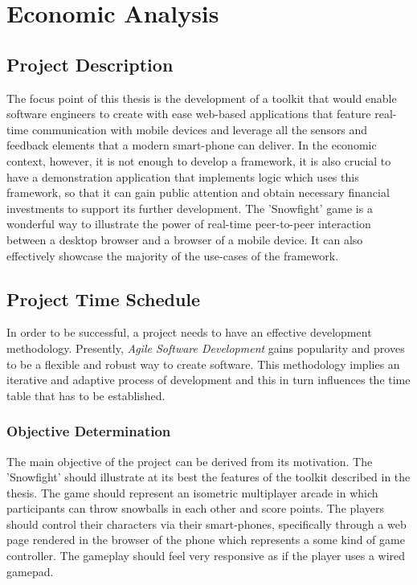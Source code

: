 \section{Economic Analysis}

\subsection{Project Description}

The focus point of this thesis is the development of a toolkit that would
enable software engineers to create with ease web-based applications that
feature real-time communication with mobile devices and leverage all the
sensors and feedback elements that a modern smart-phone can deliver. In the
economic context, however, it is not enough to develop a framework, it is also
crucial to have a demonstration application that implements logic which uses
this framework, so that it can gain public attention and obtain necessary
financial investments to support its further development. The 'Snowfight' game
is a wonderful way to illustrate the power of real-time peer-to-peer
interaction between a desktop browser and a browser of a mobile device. It can
also effectively showcase the majority of the use-cases of the framework.

\subsection{Project Time Schedule}

In order to be successful, a project needs to have an effective development
methodology. Presently, \emph{Agile Software Development} gains popularity and
proves to be a flexible and robust way to create software. This methodology
implies an iterative and adaptive process of development and this in turn
influences the time table that has to be established.

\subsubsection{Objective Determination}

The main objective of the project can be derived from its motivation. The
'Snowfight' should illustrate at its best the features of the toolkit
described in the thesis. The game should represent an isometric multiplayer
arcade in which participants can throw snowballs in each other and score
points. The players should control their characters via their smart-phones,
specifically through a web page rendered in the browser of the phone which
represents a some kind of game controller. The gameplay should feel very
responsive as if the player uses a wired gamepad.

